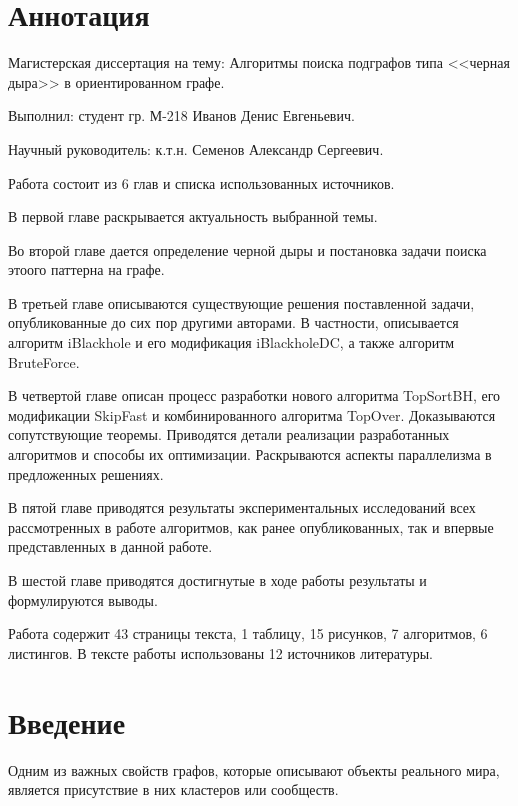 \documentclass[12pt,a4paper,oneside,openany]{article}
\theoremstyle{definition}
\theoremstyle{lemma}
\theoremstyle{remark}
\begin{document}
\setcounter{tocdepth}{2}
\tableofcontents
\thispagestyle{empty}

\cleardoublepage


\cleardoublepage
\setcounter{page}{3}
\section*{Аннотация}\label{sec:annotation}
Магистерская диссертация на тему: Алгоритмы поиска подграфов типа <<черная дыра>> в ориентированном графе.

Выполнил: студент гр. М-218 Иванов Денис Евгеньевич.

Научный руководитель: к.т.н. Семенов Александр Сергеевич.

Работа состоит из 6 глав и списка использованных источников.

В первой главе раскрывается актуальность выбранной темы.

Во второй главе дается определение черной дыры и постановка задачи поиска этоого паттерна на графе.

В третьей главе описываются существующие решения поставленной задачи, опубликованные до сих пор другими авторами.
В частности, описывается алгоритм iBlackhole и его модификация iBlackholeDC, а также алгоритм BruteForce.

В четвертой главе описан процесс разработки нового алгоритма TopSortBH, его модификации SkipFast и комбинированного
алгоритма TopOver. Доказываются сопутствующие теоремы. Приводятся детали реализации
разработанных алгоритмов и способы их оптимизации. Раскрываются аспекты параллелизма в предложенных решениях.

В пятой главе приводятся результаты экспериментальных исследований всех рассмотренных в работе алгоритмов, как
ранее опубликованных, так и впервые представленных в данной работе.

В шестой главе приводятся достигнутые в ходе работы результаты и формулируются выводы.

Работа содержит 43 страницы текста, 1 таблицу, 15 рисунков, 7 алгоритмов, 6 листингов.
В тексте работы использованы 12 источников литературы.

\cleardoublepage
\section{Введение}\label{sec:otherintro}

Одним из важных свойств графов, которые описывают объекты реального мира,
является присутствие в них кластеров или сообществ.
\end{document}
